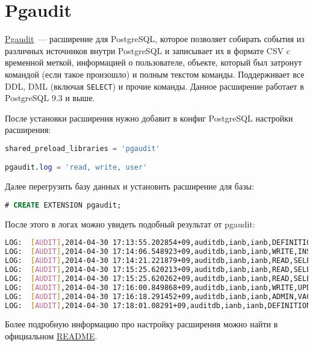 \section{Pgaudit}

\href{https://github.com/2ndQuadrant/pgaudit}{Pgaudit}~--- расширение для PostgreSQL, которое позволяет собирать события из различных источников внутри PostgreSQL и записывает их в формате CSV c временной меткой, информацией о пользователе, объекте, который был затронут командой (если такое произошло) и полным текстом команды. Поддерживает все DDL, DML (включая \lstinline!SELECT!) и прочие команды. Данное расширение работает в PostgreSQL 9.3 и выше.

После установки расширения нужно добавит в конфиг PostgreSQL настройки расширения:

\begin{lstlisting}[language=SQL,label=lst:pgaudit1,caption=Pgaudit]
shared_preload_libraries = 'pgaudit'

pgaudit.log = 'read, write, user'
\end{lstlisting}

Далее перегрузить базу данных и установить расширение для базы:

\begin{lstlisting}[language=SQL,label=lst:pgaudit2,caption=Pgaudit]
# CREATE EXTENSION pgaudit;
\end{lstlisting}

После этого в логах можно увидеть подобный результат от pgaudit:

\begin{lstlisting}[language=Bash,label=lst:pgaudit3,caption=Pgaudit]
LOG:  [AUDIT],2014-04-30 17:13:55.202854+09,auditdb,ianb,ianb,DEFINITION,CREATE TABLE,TABLE,public.x,CREATE  TABLE  public.x (a pg_catalog.int4   , b pg_catalog.int4   )   WITH (oids=OFF)
LOG:  [AUDIT],2014-04-30 17:14:06.548923+09,auditdb,ianb,ianb,WRITE,INSERT,TABLE,public.x,INSERT INTO x VALUES(1,1);
LOG:  [AUDIT],2014-04-30 17:14:21.221879+09,auditdb,ianb,ianb,READ,SELECT,TABLE,public.x,SELECT * FROM x;
LOG:  [AUDIT],2014-04-30 17:15:25.620213+09,auditdb,ianb,ianb,READ,SELECT,VIEW,public.v_x,SELECT * from v_x;
LOG:  [AUDIT],2014-04-30 17:15:25.620262+09,auditdb,ianb,ianb,READ,SELECT,TABLE,public.x,SELECT * from v_x;
LOG:  [AUDIT],2014-04-30 17:16:00.849868+09,auditdb,ianb,ianb,WRITE,UPDATE,TABLE,public.x,UPDATE x SET a=a+1;
LOG:  [AUDIT],2014-04-30 17:16:18.291452+09,auditdb,ianb,ianb,ADMIN,VACUUM,,,VACUUM x;
LOG:  [AUDIT],2014-04-30 17:18:01.08291+09,auditdb,ianb,ianb,DEFINITION,CREATE FUNCTION,FUNCTION,public.func_x(),CREATE  FUNCTION public.func_x() RETURNS  pg_catalog.int4 LANGUAGE sql  VOLATILE  CALLED ON NULL INPUT SECURITY INVOKER COST 100.000000   AS $dprs_$SELECT a FROM x LIMIT 1;$dprs_$
\end{lstlisting}

Более подробную информацию про настройку расширения можно найти в официальном \href{https://github.com/2ndQuadrant/pgaudit#configuration}{README}.

